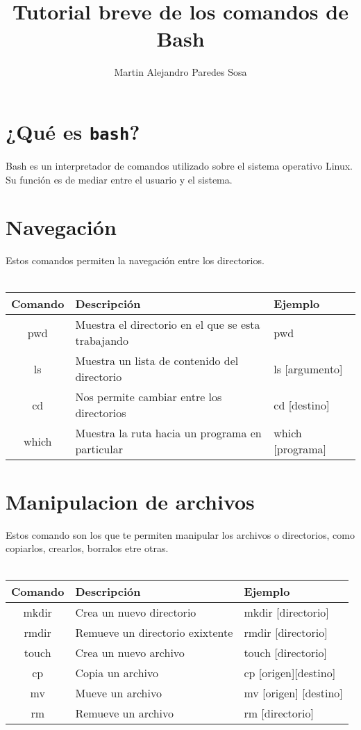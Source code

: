 \documentclass[12pt]{article}
\title{Tutorial breve de los comandos de Bash}
\author{Martin Alejandro Paredes Sosa}
\begin{document}
\maketitle

\section{¿Qué es {\tt bash}?}
Bash es un interpretador de comandos utilizado sobre el sistema operativo Linux. 
Su función es de mediar entre el usuario y el sistema.

\section{Navegación}
Estos comandos permiten la navegación entre los directorios. \\ \\
\begin{tabular}{|c|l|l|}
\hline
Comando & Descripción & Ejemplo \\
\hline
pwd & Muestra el directorio en el que se esta trabajando & pwd \\ \hline
ls & Muestra un lista de contenido del directorio & ls [argumento]\\ \hline
cd & Nos permite cambiar entre los directorios & cd [destino] \\\hline
which & Muestra la ruta hacia un programa en particular & which [programa] \\ \hline
\end{tabular} 

\section{Manipulacion de archivos}
Estos comando son los que te permiten manipular los archivos o directorios, como copiarlos, crearlos, borralos etre otras.\\ \\
\begin{tabular}{|c|l|l|}
\hline Comando & Descripción & Ejemplo \\ \hline
mkdir & Crea un nuevo directorio & mkdir [directorio] \\ \hline
rmdir & Remueve un directorio exixtente & rmdir [directorio] \\ \hline
touch & Crea un nuevo archivo & touch [directorio] \\ \hline
cp & Copia un archivo & cp [origen][destino] \\ \hline
mv & Mueve un archivo & mv [origen] [destino] \\ \hline
rm & Remueve un archivo & rm [directorio] \\ \hline
\end{tabular} 
\end{document}
